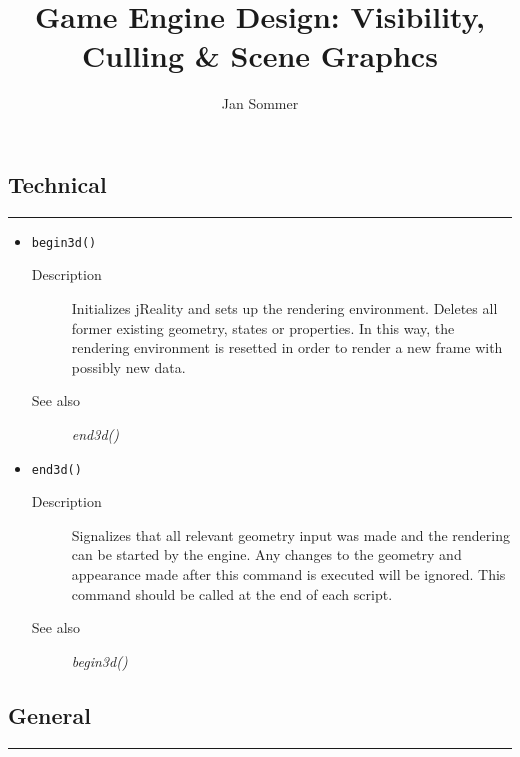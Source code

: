 \documentclass[10pt,a4widepaper]{scrartcl}
\author{Jan Sommer}
\title{Game Engine Design: Visibility, Culling \& Scene Graphcs}
\newcommand{\csubsection}[1]{\subsection*{#1}\vspace{-0.55cm}\textcolor{CBlue}{\rule[1ex]{\textwidth}{0.4pt}}}
\newcommand{\cBlue}[1]{\textcolor{CBlue}{\texttt{#1}}}
\newcommand{\desc}{\item[Description]}
\newcommand{\salso}{\item[See also]}
\begin{document}
\csubsection{Technical}
\begin{itemize}

\item \cBlue{begin3d()}
\begin{description}
\desc Initializes jReality and sets up the rendering environment. Deletes all former existing geometry, states or properties. In this way, the rendering environment is resetted in order to render a new frame with possibly new data.
\salso \textit{end3d()}
\end{description}

\item \cBlue{end3d()}
\begin{description}
\desc Signalizes that all relevant geometry input was made and the rendering can be started by the engine. Any changes to the geometry and appearance made after this command is executed will be ignored. This command should be called at the end of each script.
\salso \textit{begin3d()}
\end{description}

\end{itemize}
\csubsection{General}
\end{document}
